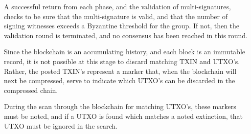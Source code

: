 \documentclass[a4paper, 10pt, conference]{ieeeconf}
\begin{document}
A successful return from each phase, and the validation of multi-signatures, checks to be sure that the multi-signature is valid, and that the number of signing witnesses exceeds a Byzantine threshold for the group. If not, then the validation round is terminated, and no consensus has been reached in this round.

Since the blockchain is an accumulating history, and each block is an immutable record, it is not possible at this stage to discard matching TXIN and UTXO's. Rather, the posted TXIN's represent a marker that, when the blockchain will next be compressed, serve to indicate which UTXO's can be discarded in the compressed chain.

During the scan through the blockchain for matching UTXO's, these markers must be noted, and if a UTXO is found which matches a noted extinction, that UTXO must be ignored in the search.
\end{document}
